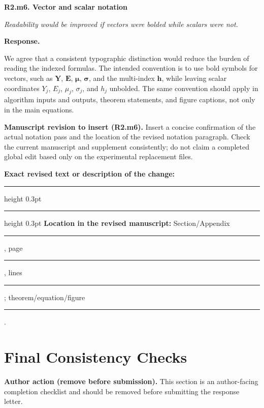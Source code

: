 \documentclass[11pt]{article}
\numberwithin{equation}{section}
\newcommand{\authoraction}[1]{%
  \par\begingroup\small\color{AuthorRed}%
  \textbf{Author action (remove before submission).} #1\par\endgroup}
\newcommand{\reviewercomment}[2]{%
  \par\medskip\noindent\textbf{#1}\par\nopagebreak
  \begingroup\color{ReviewerBlue}\itshape #2\par\endgroup
  \noindent\textbf{Response.} }
\newcommand{\revisionblock}[2]{%
  \par\begingroup\color{AuthorRed}\small
  \textbf{Manuscript revision to insert (#1).} #2\par
  \textbf{Exact revised text or description of the change:}\par
  \vspace{0.35em}\hrule height 0.3pt\vspace{1.4em}
  \hrule height 0.3pt\vspace{0.6em}
  \textbf{Location in the revised manuscript:}
  Section/Appendix \rule{1.3cm}{0.3pt},
  page \rule{1cm}{0.3pt},
  lines \rule{1.3cm}{0.3pt};
  theorem/equation/figure \rule{1.4cm}{0.3pt}.
  \par\endgroup}
\begin{document}
\reviewercomment{R2.m6. Vector and scalar notation}{%
Readability would be improved if vectors were bolded while
scalars were not.}

We agree that a consistent typographic distinction would reduce
the burden of reading the indexed formulas. The intended
convention is to use bold symbols for vectors, such as
$\bm Y$, $\bm E$, $\bm\mu$, $\bm\sigma$, and the multi-index
$\bm h$, while leaving scalar coordinates $Y_j$, $E_j$,
$\mu_j$, $\sigma_j$, and $h_j$ unbolded. The same convention
should apply in algorithm inputs and outputs, theorem statements,
and figure captions, not only in the main equations.

\revisionblock{R2.m6}{Insert a concise confirmation of the
actual notation pass and the location of the revised notation
paragraph. Check the current manuscript and supplement
consistently; do not claim a completed global edit based only
on the experimental replacement files.}

\section{Final Consistency Checks}
\label{sec:checks}

\authoraction{This section is an author-facing completion checklist
and should be removed before submitting the response letter.}
\end{document}
